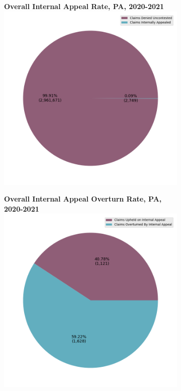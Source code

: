 \documentclass[12pt, a4paper,twoside]{report}
\theoremstyle{plain} %
\theoremstyle{definition} %
\theoremstyle{remark} %
\numberwithin{equation}{chapter}
\begin{document}
		\begin{figure}[h!]
			\centering
			\begin{subfigure}[b]{0.49\textwidth}
				\centering
				\textbf{Overall Internal Appeal Rate, PA, 2020-2021}
				\includegraphics[width=\textwidth]{images/pa_claims/internal_appeal_pie.png}
			\end{subfigure}
			\hfill
			\begin{subfigure}[b]{0.49\textwidth}
				\centering
				\textbf{Overall Internal Appeal Overturn Rate, PA, 2020-2021}
				\includegraphics[width=\textwidth]{images/pa_claims/internal_appeal_overturns_pie.png}

\end{subfigure}
\end{figure}
\end{document}
